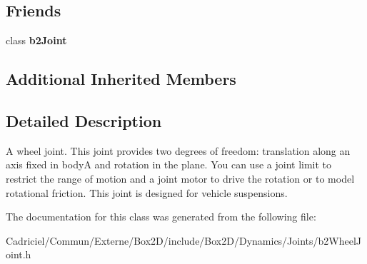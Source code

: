 \subsection*{Friends}
\begin{DoxyCompactItemize}
\item 
class {\bfseries b2\+Joint}\hypertarget{classb2_wheel_joint_a54ade8ed3d794298108d7f4c4e4793fa}{}\label{classb2_wheel_joint_a54ade8ed3d794298108d7f4c4e4793fa}

\end{DoxyCompactItemize}
\subsection*{Additional Inherited Members}


\subsection{Detailed Description}
A wheel joint. This joint provides two degrees of freedom\+: translation along an axis fixed in bodyA and rotation in the plane. You can use a joint limit to restrict the range of motion and a joint motor to drive the rotation or to model rotational friction. This joint is designed for vehicle suspensions. 

The documentation for this class was generated from the following file\+:\begin{DoxyCompactItemize}
\item 
Cadriciel/\+Commun/\+Externe/\+Box2\+D/include/\+Box2\+D/\+Dynamics/\+Joints/b2\+Wheel\+Joint.\+h\end{DoxyCompactItemize}
